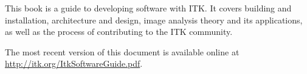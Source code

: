 This book is a guide to developing software with ITK. It covers building and
installation, architecture and design, image analysis theory and its
applications, as well as the process of contributing to the ITK community.

%

The most recent version of this document is available online at
\url{http://itk.org/ItkSoftwareGuide.pdf}.
